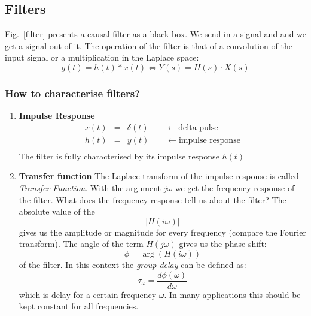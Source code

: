 \documentclass[12pt,a4paper]{article}
\begin{document}
\subsection{Filters}
Fig.~\ref{filter} presents a causal filter as a black box. We
send in a signal and and we get a signal out of it. The
operation of the filter is that of a convolution of the input
signal or a multiplication in the Laplace space:
\begin{equation} 
g(t) = h(t) * x(t) \Leftrightarrow Y(s) = H(s) \cdot X(s)
\end{equation}

\subsubsection{How to characterise filters?}

\begin{enumerate}
\item{\bf Impulse Response}
\begin{eqnarray}
x(t) & = & \delta(t) \qquad \leftarrow \mbox{delta pulse} \\
h(t) & = & y(t) \qquad \leftarrow \mbox{impulse response} \\
\end{eqnarray}
The filter is fully characterised by its impulse response $h(t)$

\item{\bf Transfer function}
The Laplace transform of the impulse response is called
\textsl{Transfer Function}. With the argument $j\omega$ we
get the frequency
response of the filter. What does the frequency response tell us about
the filter?  The absolute value of the
\begin{equation}
|H(i \omega)|
\end{equation}
gives us the amplitude or magnitude for every frequency
(compare the Fourier transform).
The angle of the term $H(j\omega)$ gives us the phase shift:
\begin{equation}
\phi = \arg\left(H(i \omega) \right)
\end{equation}
of the filter. In this context the \textsl{group delay} can
be defined as:
\begin{equation}
\tau_{\omega} = \frac{d \phi (\omega)}{d\omega}
\end{equation}
which is delay for a certain frequency $\omega$. In many applications
this should be kept constant for all frequencies.
\end{enumerate}
\end{document}
